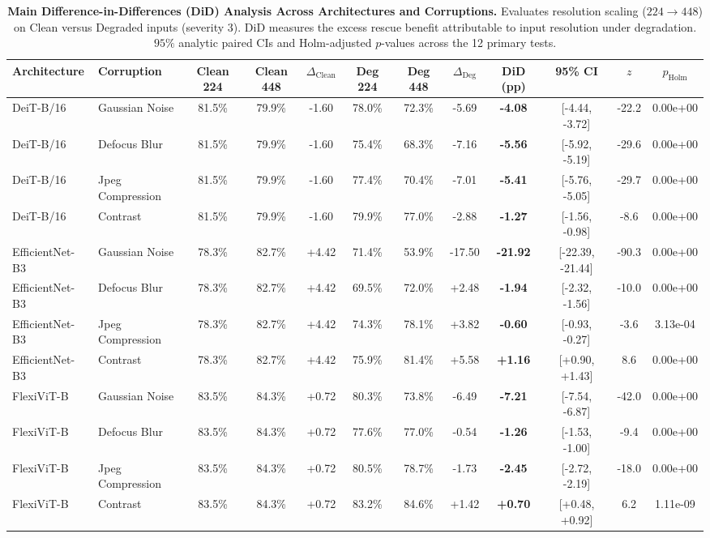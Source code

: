 \begin{table}[t]
\centering
\small
\caption{\textbf{Main Difference-in-Differences (DiD) Analysis Across Architectures and Corruptions.}
Evaluates resolution scaling ($224 \to 448$) on Clean versus Degraded inputs (severity 3).
DiD measures the excess rescue benefit attributable to input resolution under degradation. $95\%$ analytic paired CIs and Holm-adjusted $p$-values across the 12 primary tests.}
\label{tab:main_did}
\begin{tabular}{llcccccccccc}
\toprule
\textbf{Architecture} & \textbf{Corruption} & \textbf{Clean 224} & \textbf{Clean 448} & $\Delta_{\text{Clean}}$ & \textbf{Deg 224} & \textbf{Deg 448} & $\Delta_{\text{Deg}}$ & \textbf{DiD (pp)} & \textbf{95\% CI} & $z$ & $p_{\text{Holm}}$ \\
\midrule
DeiT-B/16 & Gaussian Noise & 81.5\% & 79.9\% & -1.60 & 78.0\% & 72.3\% & -5.69 & \textbf{-4.08} & [-4.44, -3.72] & -22.2 & 0.00e+00 \\
DeiT-B/16 & Defocus Blur & 81.5\% & 79.9\% & -1.60 & 75.4\% & 68.3\% & -7.16 & \textbf{-5.56} & [-5.92, -5.19] & -29.6 & 0.00e+00 \\
DeiT-B/16 & Jpeg Compression & 81.5\% & 79.9\% & -1.60 & 77.4\% & 70.4\% & -7.01 & \textbf{-5.41} & [-5.76, -5.05] & -29.7 & 0.00e+00 \\
DeiT-B/16 & Contrast & 81.5\% & 79.9\% & -1.60 & 79.9\% & 77.0\% & -2.88 & \textbf{-1.27} & [-1.56, -0.98] & -8.6 & 0.00e+00 \\
EfficientNet-B3 & Gaussian Noise & 78.3\% & 82.7\% & +4.42 & 71.4\% & 53.9\% & -17.50 & \textbf{-21.92} & [-22.39, -21.44] & -90.3 & 0.00e+00 \\
EfficientNet-B3 & Defocus Blur & 78.3\% & 82.7\% & +4.42 & 69.5\% & 72.0\% & +2.48 & \textbf{-1.94} & [-2.32, -1.56] & -10.0 & 0.00e+00 \\
EfficientNet-B3 & Jpeg Compression & 78.3\% & 82.7\% & +4.42 & 74.3\% & 78.1\% & +3.82 & \textbf{-0.60} & [-0.93, -0.27] & -3.6 & 3.13e-04 \\
EfficientNet-B3 & Contrast & 78.3\% & 82.7\% & +4.42 & 75.9\% & 81.4\% & +5.58 & \textbf{+1.16} & [+0.90, +1.43] & 8.6 & 0.00e+00 \\
FlexiViT-B & Gaussian Noise & 83.5\% & 84.3\% & +0.72 & 80.3\% & 73.8\% & -6.49 & \textbf{-7.21} & [-7.54, -6.87] & -42.0 & 0.00e+00 \\
FlexiViT-B & Defocus Blur & 83.5\% & 84.3\% & +0.72 & 77.6\% & 77.0\% & -0.54 & \textbf{-1.26} & [-1.53, -1.00] & -9.4 & 0.00e+00 \\
FlexiViT-B & Jpeg Compression & 83.5\% & 84.3\% & +0.72 & 80.5\% & 78.7\% & -1.73 & \textbf{-2.45} & [-2.72, -2.19] & -18.0 & 0.00e+00 \\
FlexiViT-B & Contrast & 83.5\% & 84.3\% & +0.72 & 83.2\% & 84.6\% & +1.42 & \textbf{+0.70} & [+0.48, +0.92] & 6.2 & 1.11e-09 \\
\bottomrule
\end{tabular}
\end{table}
